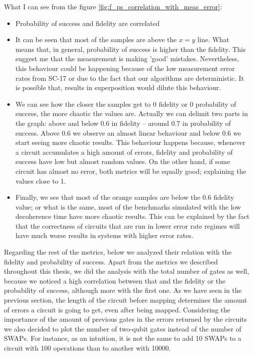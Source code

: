 What I can see from the figure \ref{fig:f_ps_correlation_with_meas_error}:

\begin{itemize}
\item Probability of success and fidelity are correlated
\item It can be seen that most of the samples are above the \(x=y\) line. What means that, in general, probability of success is higher than the fidelity. This suggest me that the measurement is making 'good' mistakes. Nevertheless, this behaviour could be happening because of the low measurement error rates from SC-17 or due to the fact that our algorithms are deterministic. It is possible that, results in superposition would dilute this behaviour.
\item We can see how the closer the samples get to 0 fidelity or 0 probability of success, the more chaotic the values are. Actually we can delimit two parts in the graph: above and below 0.6 in fidelity -- around 0.7 in probability of success. Above 0.6 we observe an almost linear behaviour and below 0.6 we start seeing more chaotic results. This behaviour happens because, whenever a circuit accumulates a high amount of errors, fidelity and probability of success have low but almost random values. On the other hand, if some circuit has almost no error, both metrics will be equally good; explaining the values close to 1.
\item Finally, we see that most of the orange samples are below the 0.6 fidelity value; or what is the same, most of the benchmarks simulated with the low decoherence time have more chaotic results. This can be explained by the fact that the correctness of circuits that are run in lower error rate regimes will have much worse results in systems with higher error rates.
\end{itemize}



Regarding the rest of the metrics, below we analyzed their relation with the fidelity and probability of success.
Apart from the metrics we described throughout this thesis, we did the analysis with the total number of gates as well, because we noticed a high correlation between that and the fidelity or the probability of success, although more with the first one.
As we have seen in the previous section, the length of the circuit before mapping determines the amount of errors a circuit is going to get, even after being mapped.
Considering the importance of the amount of previous gates in the errors returned by the circuits we also decided to plot the number of two-qubit gates instead of the number of SWAPs.
For instance, as an intuition, it is not the same to add 10 SWAPs to a circuit with 100 operations than to another with 10000.


